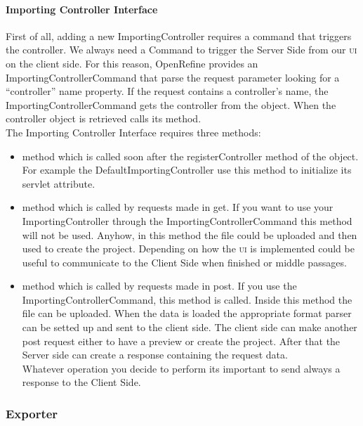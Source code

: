\paragraph{Importing Controller Interface} First of all, adding a new ImportingController requires a command that triggers the controller. We always need a Command to trigger the Server Side from our \textsc{ui} on the client side. For this reason, OpenRefine provides an ImportingControllerCommand that parse the request parameter looking for a ``controller'' name property. If the request contains a controller's name, the ImportingControllerCommand gets the controller from the  object. When the controller object is retrieved calls its  method. \\
The Importing Controller Interface requires three methods: 
\begin{itemize}
	\item {} method which is called soon after the registerController method of the  object. For example the DefaultImportingController use this method to initialize its servlet attribute.
	\item {} method which is called by requests made in get. If you want to use your ImportingController through the ImportingControllerCommand this method will not be used. Anyhow, in this method the file could be uploaded and then used to create the project. Depending on how the \textsc{ui} is implemented could be useful to communicate to the Client Side when finished or middle passages.
	\item {} method which is called by requests made in post. If you use the ImportingControllerCommand, this method is called. Inside this method the file can be uploaded. When the data is loaded the appropriate format parser can be setted up and sent to the client side. The client side can make another post request either to have a preview or create the project. After that the Server side can create a response containing the request data.\\
	Whatever operation you decide to perform its important to send always a response to the Client Side.
\end{itemize}

\subsubsection{Exporter}
